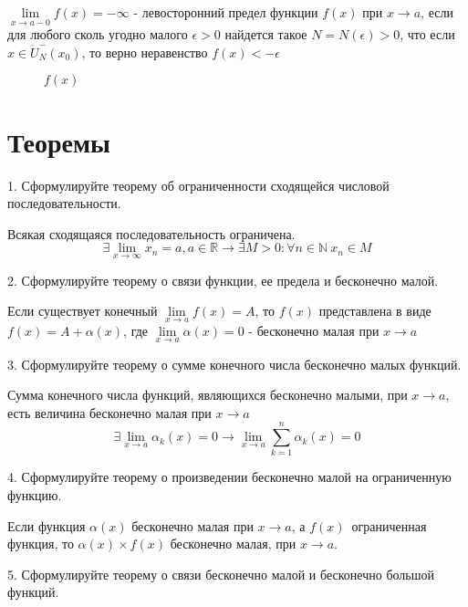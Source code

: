 \documentclass[a4paper, 10pt]{article}
\newcommand{\image}[3]{
	\begin{figure}[ht]
		\center{\texttt{[image: img/\#1]} }
		\caption{\textit{#3}}\end{figure}
}
\begin{document}
    $\lim\limits_{x \to a-0} f (x) = -\infty$ - левосторонний предел функции $f(x)$ при $x \to a$, если 
    для любого сколь угодно малого $\epsilon > 0$ найдется такое $N = N(\epsilon) > 0$, что если
    $x \in \mathring U_N^-(x_0)$, то верно неравенство $f(x) < -\epsilon$
    \image{4.png}{200}{$f(x)$}

\newpage
\section{Теоремы}

    \begin{bf}1. Сформулируйте теорему об ограниченности сходящейся числовой последовательности. \end{bf}

    Всякая сходящаяся последовательность ограничена.
    $$\exists \lim\limits_{x \to \infty} x_n = a, a \in \mathbb{R} \rightarrow 
    \exists M > 0: \forall n \in \mathbb{N} \  x_n \in M$$

    \begin{bf}2. Сформулируйте теорему о связи функции, ее предела и бесконечно малой. \end{bf}

    Если существует конечный $\lim\limits_{x \to a} f(x) = A$, то $f(x)$ представлена в виде
    $f(x) = A + \alpha  (x)$, где $\lim\limits_{x \to a} \alpha  (x) = 0$ - бесконечно малая при $x \to a$

    \begin{bf}3. Сформулируйте теорему о сумме конечного числа бесконечно малых функций. \end{bf}

    Сумма конечного числа функций, являющихся бесконечно малыми, при $x \to a$, 
    есть величина бесконечно малая при $x \to a$
    $$\exists \lim\limits_{x \to a} \alpha _k (x) = 0 \rightarrow \lim\limits_{x \to a} 
    \sum\limits_{k=1}^n \alpha _k (x) = 0$$


    \begin{bf}4. Сформулируйте теорему о произведении бесконечно малой на ограниченную функцию. \end{bf}
    
    Если функция $\alpha  (x)$ бесконечно малая при $x \to a$, а $f(x)$ ограниченная функция, то
    $\alpha  (x) \times f(x)$ бесконечно малая, при $x \to a$.

    \begin{bf}5. Сформулируйте теорему о связи бесконечно малой и бесконечно большой функций. \end{bf}
\end{document}
